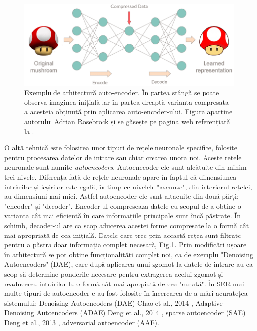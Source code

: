 \documentclass[a4paper,12pt]{book}
\begin{document}
						\begin{figure}[h]
							\centering
							\includegraphics[scale=0.4]{mushroom_encoder}
							\caption{Exemplu de arhitectură auto-encoder. În partea stângă se poate observa imaginea inițială iar în partea dreaptă varianta compresata a acesteia obținută prin aplicarea auto-encoder-ului. 
							Figura aparține autorului Adrian Rosebrock și se găsește pe pagina web referențiată la \cite{auto}.}
							\label{fig:ae}							
						\end{figure}		
						O altă tehnică este folosirea unor tipuri de rețele neuronale specifice, folosite pentru procesarea datelor de intrare sau chiar crearea unora noi. Aceste rețele neuronale sunt numite \textit{autoencoders}. Autoenecoder-ele sunt alcătuite din minim trei nivele. Diferența față de rețele neuronale apare în faptul că dimensiunea intrărilor și ieșirilor este egală, în timp ce nivelele "ascunse", din interiorul rețelei, au dimensiuni mai mici. Astfel autoencoder-ele sunt altacuite din două părți: "encoder" și "decoder". Encoder-ul compreseaza datele cu scopul de a obține o varianta cât mai eficientă în care informațiile principale sunt încă păstrate. În schimb, decoder-ul are ca scop aducerea acestei forme compresate la o formă cât mai apropriată de cea inițială. Datele care trec prin această rețea sunt filtrate pentru a păstra doar informația complet necesară, Fig.\ref{fig:ae}. Prin modificări ușoare în arhitectură se pot obține funcționalități complet noi, ca de exemplu "Denoising Autoencoders" (DAE), care după aplicarea unui zgomot la datele de intrare au ca scop să determine ponderile necesare pentru extragerea acelui zgomot și readucerea intrărilor la o formă cât mai apropiată de cea "curată". În SER mai multe tipuri de autoencoder-e au fost folosite în încercarea de a mări acuratețea sistemului: Denoising Autoencoders (DAE) Chao et al., 2014 \cite{dae}, Adaptive Denoising Autoencoders (ADAE) Deng et al., 2014 \cite{adae}, sparse autoencoder (SAE) Deng et al., 2013 \cite{sdae}, adversarial autoencoder (AAE). \par
\end{document}
